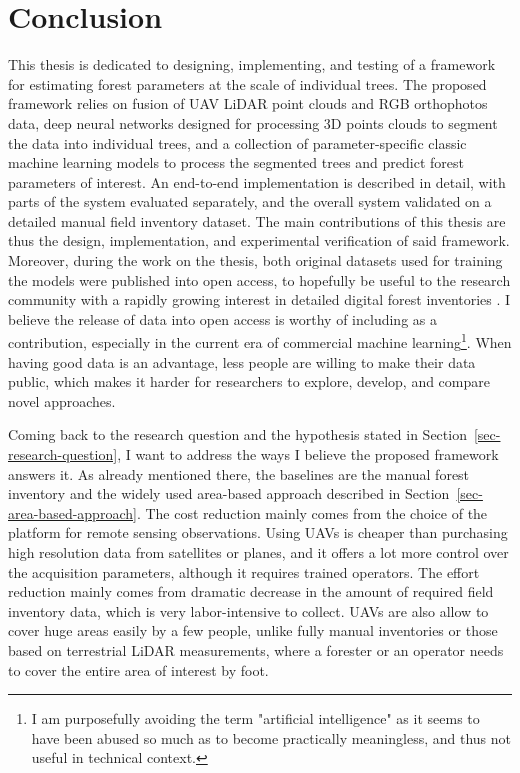 \chapter{Conclusion}\label{cap:conclusion}


This thesis is dedicated to designing, implementing, and testing of a framework for estimating forest parameters at the scale of individual trees.
The proposed framework relies on fusion of UAV LiDAR point clouds and RGB orthophotos data, deep neural networks designed for processing 3D points clouds to segment the data into individual trees, and a collection of parameter-specific classic machine learning models to process the segmented trees and predict forest parameters of interest.
An end-to-end implementation is described in detail, with parts of the system evaluated separately, and the overall system validated on a detailed manual field inventory dataset.
The main contributions of this thesis are thus the design, implementation, and experimental verification of said framework.
Moreover, during the work on the thesis, both original datasets used for training the models were published into open access, to hopefully be useful to the research community with a rapidly growing interest in detailed digital forest inventories \citep{dubrovinExplorationPropertiesPoint2024, dubrovinOpenDatasetIndividual2024}.
I believe the release of data into open access is worthy of including as a contribution, especially in the current era of commercial machine learning\footnote{I am purposefully avoiding the term "artificial intelligence" as it seems to have been abused so much as to become practically meaningless, and thus not useful in technical context.}.
When having good data is an advantage, less people are willing to make their data public, which makes it harder for researchers to explore, develop, and compare novel approaches.

Coming back to the research question and the hypothesis stated in Section~\ref{sec-research-question}, I want to address the ways I believe the proposed framework answers it.
As already mentioned there, the baselines are the manual forest inventory and the widely used area-based approach described in Section~\ref{sec-area-based-approach}.
The cost reduction mainly comes from the choice of the platform for remote sensing observations.
Using UAVs is cheaper than purchasing high resolution data from satellites or planes, and it offers a lot more control over the acquisition parameters, although it requires trained operators.
The effort reduction mainly comes from dramatic decrease in the amount of required field inventory data, which is very labor-intensive to collect.
UAVs are also allow to cover huge areas easily by a few people, unlike fully manual inventories or those based on terrestrial LiDAR measurements, where a forester or an operator needs to cover the entire area of interest by foot.

